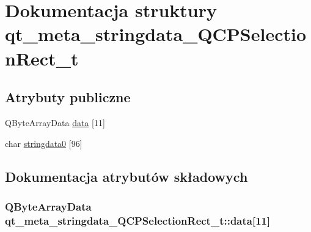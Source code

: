\hypertarget{structqt__meta__stringdata___q_c_p_selection_rect__t}{}\section{Dokumentacja struktury qt\+\_\+meta\+\_\+stringdata\+\_\+\+Q\+C\+P\+Selection\+Rect\+\_\+t}
\label{structqt__meta__stringdata___q_c_p_selection_rect__t}
\subsection*{Atrybuty publiczne}
\begin{DoxyCompactItemize}
\item 
Q\+Byte\+Array\+Data \hyperlink{structqt__meta__stringdata___q_c_p_selection_rect__t_aa58583b159c4713d8ea71032fddcc13f}{data} \mbox{[}11\mbox{]}
\item 
char \hyperlink{structqt__meta__stringdata___q_c_p_selection_rect__t_a39a87de1040c403f0ba00fdaedecbb79}{stringdata0} \mbox{[}96\mbox{]}
\end{DoxyCompactItemize}


\subsection{Dokumentacja atrybutów składowych}
\subsubsection[{\texorpdfstring{data}{data}}]{\setlength{\rightskip}{0pt plus 5cm}Q\+Byte\+Array\+Data qt\+\_\+meta\+\_\+stringdata\+\_\+\+Q\+C\+P\+Selection\+Rect\+\_\+t\+::data\mbox{[}11\mbox{]}}\hypertarget{structqt__meta__stringdata___q_c_p_selection_rect__t_aa58583b159c4713d8ea71032fddcc13f}{}\label{structqt__meta__stringdata___q_c_p_selection_rect__t_aa58583b159c4713d8ea71032fddcc13f}

